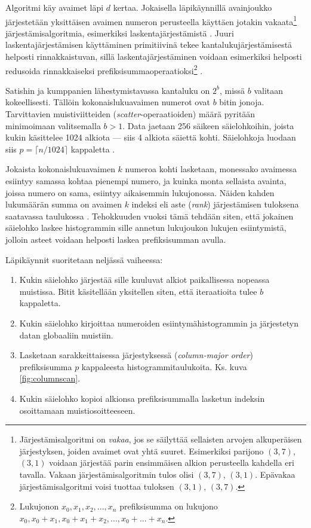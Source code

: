 \documentclass[a4paper,11pt]{article}
\newcommand{\engl}[1]{\foreignlanguage{english}{\em #1}}
\begin{document}
Algoritmi käy avaimet läpi $d$ kertaa. Jokaisella läpikäynnillä avainjoukko järjestetään yksittäisen avaimen numeron perusteella käyttäen jotakin vakaata\footnote{Järjestämisalgoritmi on \emph{vakaa}, jos se säilyttää sellaisten arvojen alkuperäisen järjestyksen, joiden avaimet ovat yhtä suuret. Esimerkiksi parijono $(3, 7)$, $(3, 1)$ voidaan järjestää parin ensimmäisen alkion perusteella kahdella eri tavalla. Vakaan järjestämisalgoritmin tulos olisi $(3, 7)$, $(3, 1)$. Epävakaa järjestämisalgoritmi voisi tuottaa tuloksen $(3, 1)$, $(3, 7)$.} järjestämisalgoritmia, esimerkiksi laskentajärjestämistä \cite{clrs}. Juuri laskentajärjestämisen käyttäminen primitiivinä tekee kantalukujärjestämisestä helposti rinnakkaistuvan, sillä laskentajärjestäminen voidaan esimerkiksi helposti redusoida rinnakkaiseksi prefiksisummaoperaatioksi\footnote{Lukujonon $x_0, x_1, x_2, ..., x_n$ prefiksisumma on lukujono $x_0, x_0 + x_1, x_0 + x_1 + x_2, ..., x_0 + ... + x_n$.} \cite{satish2009}.

Satishin ja kumppanien \cite{satish2009} lähestymistavassa kantaluku on $2^b$, missä $b$ valitaan kokeellisesti. Tällöin kokonaislukuavaimen numerot ovat $b$ bitin jonoja. Tarvittavien muistiviitteiden (\engl{scatter}-operaatioiden) määrä pyritään minimoimaan valitsemalla $b > 1$. Data jaetaan 256 säikeen säielohkoihin, joista kukin käsittelee 1024 alkiota --- siis 4 alkiota säiettä kohti. Säielohkoja luodaan siis $p = \lceil n/1024 \rceil$ kappaletta \cite{satish2009}.

Jokaista kokonaislukuavaimen $k$ numeroa kohti lasketaan, monessako avaimessa esiintyy samassa kohtaa pienempi numero, ja kuinka monta sellaista avainta, joissa numero on sama, esiintyy aikaisemmin lukujonossa. Näiden kahden lukumäärän summa on avaimen $k$ indeksi eli aste (\engl{rank}) järjestämisen tuloksena saatavassa taulukossa \cite{satish2009}. Tehokkuuden vuoksi tämä tehdään siten, että jokainen säielohko laskee histogrammin sille annetun lukujoukon lukujen esiintymistä, jolloin asteet voidaan helposti laskea prefiksisumman avulla.

Läpikäynnit suoritetaan neljässä vaiheessa:
\begin{singlespace*}
\begin{enumerate}
\item Kukin säielohko järjestää sille kuuluvat alkiot paikallisessa nopeassa muistissa. Bitit käsitellään yksitellen siten, että iteraatioita tulee $b$ kappaletta.
\item Kukin säielohko kirjoittaa numeroiden esiintymähistogrammin ja järjestetyn datan globaaliin muistiin.
\item Lasketaan sarakkeittaisessa järjestyksessä (\engl{column-major order}) prefiksisumma $p$ kappaleesta histogrammitaulukoita. Ks. kuva \ref{fig:columnscan}.
\item Kukin säielohko kopioi alkionsa prefiksisummalla lasketun indeksin osoittamaan muistiosoitteeseen.
\end{enumerate}
\end{singlespace*}
\end{document}
